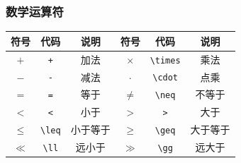 \documentclass{article}
\begin{document}
\subsubsection{数学运算符}
\begin{center}
      \begin{tabular}{ccc|ccc}
            \hline
            \textbf{符号} & \textbf{代码} & \textbf{说明} & \textbf{符号} & \textbf{代码}   & \textbf{说明} \\
            \hline
            $+$         & \verb|+|    & 加法          & $\times$    & \verb|\times| & 乘法          \\
            $-$         & \verb|-|    & 减法          & $\cdot$     & \verb|\cdot|  & 点乘          \\
            $=$         & \verb|=|    & 等于          & $\neq$      & \verb|\neq|   & 不等于         \\
            $<$         & \verb|<|    & 小于          & $>$         & \verb|>|      & 大于          \\
            $\leq$      & \verb|\leq| & 小于等于        & $\geq$      & \verb|\geq|   & 大于等于        \\
            $\ll$       & \verb|\ll|  & 远小于         & $\gg$       & \verb|\gg|    & 远大于         \\
            \hline
      \end{tabular}
\end{center}
\end{document}
